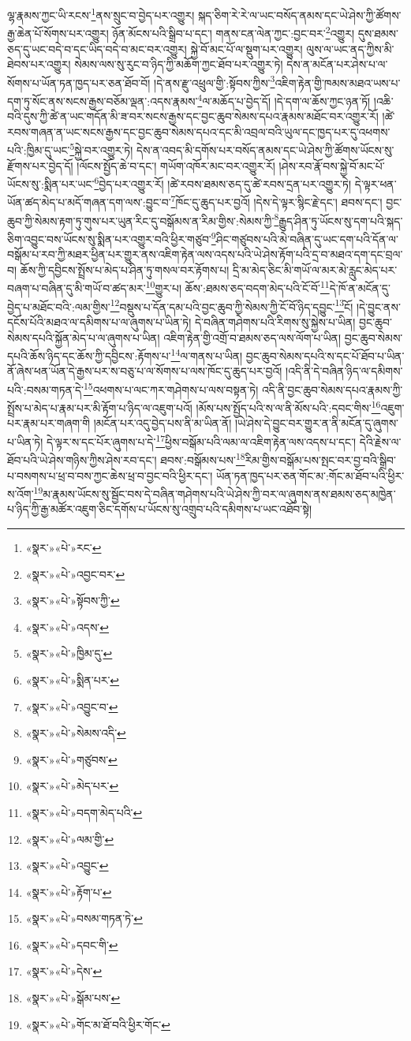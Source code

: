 ལྷ་རྣམས་ཀྱང་ཡི་རངས་\footnote{«སྣར་»«པེ་»རང་}ནས་སྲུང་བ་བྱེད་པར་འགྱུར། སྐད་ཅིག་རེ་རེ་ལ་ཡང་བསོད་ནམས་དང་ཡེ་ཤེས་ཀྱི་ཚོགས་རྒྱ་ཆེན་པོ་སོགས་པར་འགྱུར། ཉོན་མོངས་པའི་སྒྲིབ་པ་དང་། གནས་ངན་ལེན་ཀྱང་:བྱང་བར་\footnote{«སྣར་»«པེ་»འབྱང་བར་}འགྱུར། དུས་ཐམས་ཅད་དུ་ཡང་བདེ་བ་དང་ཡིད་བདེ་བ་མང་བར་འགྱུར། སྐྱེ་བོ་མང་པོ་ལ་སྡུག་པར་འགྱུར། ལུས་ལ་ཡང་ནད་ཀྱིས་མི་ཐེབས་པར་འགྱུར། སེམས་ལས་སུ་རུང་བ་ཉིད་ཀྱི་མཆོག་ཀྱང་ཐོབ་པར་འགྱུར་ཏེ། དེས་ན་མངོན་པར་ཤེས་པ་ལ་སོགས་པ་ཡོན་ཏན་ཁྱད་པར་ཅན་ཐོབ་བོ། །དེ་ནས་རྫུ་འཕྲུལ་གྱི་:སྟོབས་ཀྱིས་\footnote{«སྣར་»«པེ་»སྟོབས་ཀྱི་}འཇིག་རྟེན་གྱི་ཁམས་མཐའ་ཡས་པ་དག་ཏུ་སོང་ནས་སངས་རྒྱས་བཅོམ་ལྡན་:འདས་རྣམས་\footnote{«སྣར་»«པེ་»འདས་}ལ་མཆོད་པ་བྱེད་དོ། །དེ་དག་ལ་ཆོས་ཀྱང་ཉན་ཏོ། །འཆི་བའི་དུས་ཀྱི་ཚེ་ན་ཡང་གདོན་མི་ཟ་བར་སངས་རྒྱས་དང་བྱང་ཆུབ་སེམས་དཔའ་རྣམས་མཐོང་བར་འགྱུར་རོ། །ཚེ་རབས་གཞན་ན་ཡང་སངས་རྒྱས་དང་བྱང་ཆུབ་སེམས་དཔའ་དང་མི་འབྲལ་བའི་ཡུལ་དང་ཁྱད་པར་དུ་འཕགས་པའི་:ཁྱིམ་དུ་ཡང་\footnote{«སྣར་»«པེ་»ཁྱིམ་དུ་}སྐྱེ་བར་འགྱུར་ཏེ། དེས་ན་འབད་མི་དགོས་པར་བསོད་ནམས་དང་ཡེ་ཤེས་ཀྱི་ཚོགས་ཡོངས་སུ་རྫོགས་པར་བྱེད་དོ། །ལོངས་སྤྱོད་ཆེ་བ་དང་། གཡོག་འཁོར་མང་བར་འགྱུར་རོ། །ཤེས་རབ་རྣོ་བས་སྐྱེ་བོ་མང་པོ་ཡོངས་སུ་:སྨིན་པར་ཡང་\footnote{«སྣར་»«པེ་»སྨིན་པར་}བྱེད་པར་འགྱུར་རོ། །ཚེ་རབས་ཐམས་ཅད་དུ་ཚེ་རབས་དྲན་པར་འགྱུར་ཏེ། དེ་ལྟར་ཕན་ཡོན་ཚད་མེད་པ་མདོ་གཞན་དག་ལས་:བྱུང་བ་\footnote{«སྣར་»«པེ་»འབྱུང་བ་}ཁོང་དུ་ཆུད་པར་བྱའོ། །དེས་དེ་ལྟར་སྙིང་རྗེ་དང་། ཐབས་དང་། བྱང་ཆུབ་ཀྱི་སེམས་རྟག་ཏུ་གུས་པར་ཡུན་རིང་དུ་བསྒོམས་ན་རིམ་གྱིས་:སེམས་ཀྱི་\footnote{«སྣར་»«པེ་»སེམས་འདི་}རྒྱུད་ཤིན་ཏུ་ཡོངས་སུ་དག་པའི་སྐད་ཅིག་འབྱུང་བས་ཡོངས་སུ་སྨིན་པར་འགྱུར་བའི་ཕྱིར་གཙུབ་\footnote{«སྣར་»«པེ་»གཙུབས་}ཤིང་གཙུབས་པའི་མེ་བཞིན་དུ་ཡང་དག་པའི་དོན་ལ་བསྒོམ་པ་རབ་ཀྱི་མཐར་ཕྱིན་པར་གྱུར་ནས་འཇིག་རྟེན་ལས་འདས་པའི་ཡེ་ཤེས་རྟོག་པའི་དྲ་བ་མཐའ་དག་དང་བྲལ་བ། ཆོས་ཀྱི་དབྱིངས་སྤྲོས་པ་མེད་པ་ཤིན་ཏུ་གསལ་བར་རྟོགས་པ། དྲི་མ་མེད་ཅིང་མི་གཡོ་ལ་མར་མེ་རླུང་མེད་པར་བཞག་པ་བཞིན་དུ་མི་གཡོ་བ་ཚད་མར་\footnote{«སྣར་»«པེ་»མེད་པར་}གྱུར་པ། ཆོས་:ཐམས་ཅད་བདག་མེད་པའི་ངོ་བོ་\footnote{«སྣར་»«པེ་»བདག་མེད་པའི་}དེ་ཁོ་ན་མངོན་དུ་བྱེད་པ་མཐོང་བའི་:ལམ་གྱིས་\footnote{«སྣར་»«པེ་»ལམ་གྱི་}བསྡུས་པ་དོན་དམ་པའི་བྱང་ཆུབ་ཀྱི་སེམས་ཀྱི་ངོ་བོ་ཉིད་དབྱུང་\footnote{«སྣར་»«པེ་»འབྱུང་}ངོ། །དེ་བྱུང་ནས་དངོས་པོའི་མཐའ་ལ་དམིགས་པ་ལ་ཞུགས་པ་ཡིན་ཏེ། དེ་བཞིན་གཤེགས་པའི་རིགས་སུ་སྐྱེས་པ་ཡིན། བྱང་ཆུབ་སེམས་དཔའི་སྐྱོན་མེད་པ་ལ་ཞུགས་པ་ཡིན། འཇིག་རྟེན་གྱི་འགྲོ་བ་ཐམས་ཅད་ལས་ལོག་པ་ཡིན། བྱང་ཆུབ་སེམས་དཔའི་ཆོས་ཉིད་དང་ཆོས་ཀྱི་དབྱིངས་:རྟོགས་པ་\footnote{«སྣར་»«པེ་»རྟོག་པ་}ལ་གནས་པ་ཡིན། བྱང་ཆུབ་སེམས་དཔའི་ས་དང་པོ་ཐོབ་པ་ཡིན་ནོ་ཞེས་ཕན་ཡོན་དེ་རྒྱས་པར་ས་བཅུ་པ་ལ་སོགས་པ་ལས་ཁོང་དུ་ཆུད་པར་བྱའོ། །འདི་ནི་དེ་བཞིན་ཉིད་ལ་དམིགས་པའི་:བསམ་གཏན་དེ་\footnote{«སྣར་»«པེ་»བསམ་གཏན་ཏེ་}འཕགས་པ་ལང་ཀར་གཤེགས་པ་ལས་བསྟན་ཏེ། འདི་ནི་བྱང་ཆུབ་སེམས་དཔའ་རྣམས་ཀྱི་སྤྲོས་པ་མེད་པ་རྣམ་པར་མི་རྟོག་པ་ཉིད་ལ་འཇུག་པའོ། །མོས་པས་སྤྱོད་པའི་ས་ལ་ནི་མོས་པའི་:དབང་གིས་\footnote{«སྣར་»«པེ་»དབང་གི་}འཇུག་པར་རྣམ་པར་གཞག་གི །མངོན་པར་འདུ་བྱེད་པས་ནི་མ་ཡིན་ནོ། །ཡེ་ཤེས་དེ་བྱུང་བར་གྱུར་ན་ནི་མངོན་དུ་ཞུགས་པ་ཡིན་ཏེ། དེ་ལྟར་ས་དང་པོར་ཞུགས་པ་དེ་\footnote{«སྣར་»«པེ་»དེས་}ཕྱིས་བསྒོམ་པའི་ལམ་ལ་འཇིག་རྟེན་ལས་འདས་པ་དང་། དེའི་རྗེས་ལ་ཐོབ་པའི་ཡེ་ཤེས་གཉིས་ཀྱིས་ཤེས་རབ་དང་། ཐབས་:བསྒོམས་པས་\footnote{«སྣར་»«པེ་»སྒོམ་པས་}རིམ་གྱིས་བསྒོམ་པས་སྤང་བར་བྱ་བའི་སྒྲིབ་པ་བསགས་པ་ཕྲ་བ་བས་ཀྱང་ཆེས་ཕྲ་བ་བྱང་བའི་ཕྱིར་དང་། ཡོན་ཏན་ཁྱད་པར་ཅན་གོང་མ་:གོང་མ་ཐོབ་པའི་ཕྱིར་ས་འོག་\footnote{«སྣར་»«པེ་»གོང་མ་ཐོ་བའི་ཕྱིར་གོང་}མ་རྣམས་ཡོངས་སུ་སྦྱོང་བས་དེ་བཞིན་གཤེགས་པའི་ཡེ་ཤེས་ཀྱི་བར་ལ་ཞུགས་ནས་ཐམས་ཅད་མཁྱེན་པ་ཉིད་ཀྱི་རྒྱ་མཚོར་འཇུག་ཅིང་དགོས་པ་ཡོངས་སུ་འགྲུབ་པའི་དམིགས་པ་ཡང་འཐོབ་སྟེ། 